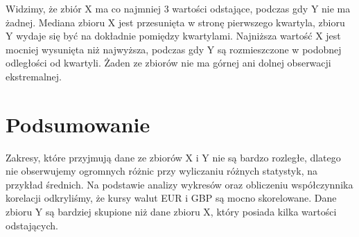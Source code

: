 \documentclass[12pt]{mwart}
\begin{document}
\noindent Widzimy, że zbiór X ma co najmniej 3 wartości odstające, podczas gdy Y nie ma żadnej. Mediana zbioru X jest przesunięta w stronę pierwszego kwartyla, zbioru Y wydaje się być na dokładnie pomiędzy kwartylami. Najniższa wartość X jest mocniej wysunięta niż najwyższa, podczas gdy Y są rozmieszczone w podobnej odległości od kwartyli. Żaden ze zbiorów nie ma górnej ani dolnej obserwacji ekstremalnej.
	\section{Podsumowanie}
	\noindent Zakresy, które przyjmują dane ze zbiorów X i Y nie są bardzo rozległe, dlatego nie obserwujemy ogromnych różnic przy wyliczaniu różnych statystyk, na przykład średnich. Na podstawie analizy wykresów oraz obliczeniu współczynnika korelacji odkryliśmy, że kursy walut EUR i GBP są mocno skorelowane. 
	Dane zbioru Y są bardziej skupione niż dane zbioru X, który posiada kilka wartości odstających. 
\end{document}
